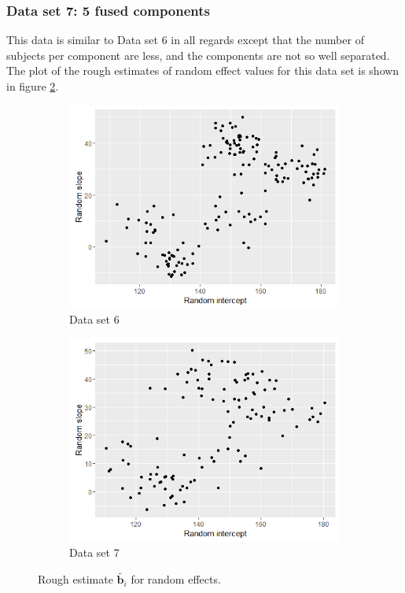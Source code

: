\subsubsection{Data set 7: 5 fused components}
\label{subsubsec : ds_5fused}
This data is similar to Data set 6 in all regards except that the number of subjects per component are less, and the components are not so well separated. The plot of the rough estimates of random effect values for this data set is shown in figure \ref{fig : ds_5fused_randplot}.

\begin{figure}[!htb]
\centering
\begin{subfigure}[b]{0.4\textwidth}
		\includegraphics[width=\textwidth]{mainmatter/chapter_5_simulation_study/ds_5wellsep_randplot.png}
        \caption{\label{fig : ds_5wellsep_randplot}Data set 6}
	\end{subfigure}
	\begin{subfigure}[b]{0.4\textwidth}
		\includegraphics[width=\textwidth]{mainmatter/chapter_5_simulation_study/ds_5fused_randplot.png}
        \caption{\label{fig : ds_5fused_randplot}Data set 7}
	\end{subfigure}
	\caption{Rough estimate $\tilde{\boldsymbol{b}_i}$ for random effects.}
	\label{fig : ds_5wellsep_5fused}    
\end{figure}


